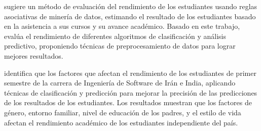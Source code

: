 

\textcite{borkar2013predicting} sugiere un método de evaluación del rendimiento de los estudiantes usando reglas asociativas de minería de datos, estimando el resultado de los estudiantes basado en la asistencia a sus cursos y su avance académico. Basado en este trabajo, \textcite{shazmeen2013performance} evalúa el rendimiento de diferentes algoritmos de clasificación y análisis predictivo, proponiendo técnicas de preprocesamiento de datos para lograr mejores resultados.


\textcite{oskouei2014predicting} identifica que los factores que afectan el rendimiento de los estudiantes de primer semestre de la carrera de Ingeniería de Software de Irán e India, aplicando técnicas de clasificación y predicción para mejorar la precisión de las predicciones de los resultados de los estudiantes. Los resultados muestran que los factores de género, entorno familiar, nivel de educación de los padres, y el estilo de vida afectan el rendimiento académico de los estudiantes independiente del país.







